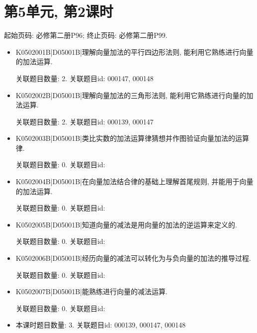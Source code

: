 \section*{第5单元, 第2课时}
起始页码: 必修第二册P96; 终止页码: 必修第二册P99.
\begin{itemize}
\item K0502001B|D05001B|理解向量加法的平行四边形法则, 能利用它熟练进行向量的加法运算.

关联题目数量: 2. 关联题目id: 000147, 000148

\item K0502002B|D05001B|理解向量加法的三角形法则, 能利用它熟练进行向量的加法运算.

关联题目数量: 2. 关联题目id: 000139, 000147

\item K0502003B|D05001B|类比实数的加法运算律猜想并作图验证向量加法的运算律.

关联题目数量: 0. 关联题目id: 

\item K0502004B|D05001B|在向量加法结合律的基础上理解首尾规则, 并能用于向量的加法运算.

关联题目数量: 0. 关联题目id: 

\item K0502005B|D05001B|知道向量的减法是用向量的加法的逆运算来定义的.

关联题目数量: 0. 关联题目id: 

\item K0502006B|D05001B|经历向量的减法可以转化为与负向量的加法的推导过程.

关联题目数量: 0. 关联题目id: 

\item K0502007B|D05001B|能熟练进行向量的减法运算.

关联题目数量: 0. 关联题目id: 

\item 本课时题目数量: 3. 关联题目id: 000139, 000147, 000148

\end{itemize}

